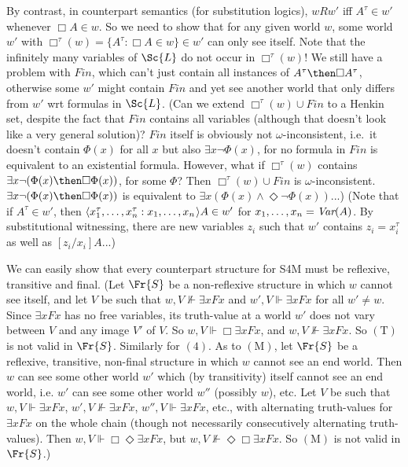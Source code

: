 \documentclass[11pt]{woarticle}
\theoremstyle{break}
\theoremstyle{nonumberplain}
\newcommand{\SAT}{\Vdash}
\newcommand{\1}{\;\,|\;\,}
\newcommand{\var}{\emph{Var}}
\renewcommand{\t}[1]{\ensuremath{\langle #1  \makebox[.2ex]{}\rangle}}
\newcommand{\T}[1]{\ensuremath{(\mathrm{ #1})}}
\begin{document}
{By contrast, in counterpart semantics (for substitution logics),
$wRw'$ iff $A^\tau \in w'$ whenever $\Box A \in w$. So we need to show
that for any given world $w$, some world $w'$ with $\Box^\tau(w) = \{
A^\tau : \Box A \in w \} \in w'$ can only see itself. Note that the
infinitely many variables of $\Sc{L}$ do not occur in $\Box^\tau(w)$!
We still have a problem with $Fin$, which can't just contain all
instances of $A^\tau \then \Box A^\tau$, otherwise some $w'$ might
contain $Fin$ and yet see another world that only differs from $w'$
wrt formulas in $\Sc{L}$. (Can we extend $\Box^\tau(w) \cup Fin$ to a
Henkin set, despite the fact that $Fin$ contains all variables
(although that doesn't look like a very general solution)? $Fin$
itself is obviously not $\omega$-inconsistent, i.e.\ it doesn't
contain $\Phi(x)$ for all $x$ but also $\exists x \neg\Phi(x)$, for no
formula in $Fin$ is equivalent to an existential formula. However,
what if $\Box^\tau(w)$ contains $\exists x \neg(\Phi(x) \then \Box
\Phi(x))$, for some $\Phi$? Then $\Box^\tau(w) \cup Fin$ is
$\omega$-inconsistent. $\exists x \neg (\Phi(x) \then \Box \Phi(x))$
is equivalent to $\exists x (\Phi(x) \land \Diamond \neg \Phi(x))$...)
(Note that if $A^\tau \in w'$, then $\t{x_1^\tau,\ldots,x_n^\tau :
  x_1, \ldots, x_n}A \in w'$ for $x_1,\ldots,x_n = \var(A)$. By
substitutional witnessing, there are new variables $z_i$ such that
$w'$ contains $z_i\!=\!x_i^\tau$ as well as $[z_i/x_i]A$...)

We can easily show that every counterpart structure for S4M must be
reflexive, transitive and final. (Let $\Fr{S}$ be a non-reflexive
structure in which $w$ cannot see itself, and let $V$ be such that
$w,V \not\SAT \exists x Fx$ and $w',V \SAT \exists x Fx$ for all
$w'\not=w$. Since $\exists x Fx$ has no free variables, its
truth-value at a world $w'$ does not vary between $V$ and any image
$V'$ of $V$. So $w,V \SAT \Box \exists x Fx$, and $w,V \not\SAT
\exists x Fx$. So \T{T} is not valid in $\Fr{S}$. Similarly for
\T{4}. As to \T{M}, let $\Fr{S}$ be a reflexive, transitive, non-final
structure in which $w$ cannot see an end world. Then $w$ can see some
other world $w'$ which (by transitivity) itself cannot see an end
world, i.e. $w'$ can see some other world $w''$ (possibly $w$),
etc. Let $V$ be such that $w,V \SAT \exists x Fx$, $w',V \not\SAT
\exists x Fx$, $w'',V \SAT \exists x Fx$, etc., with alternating
truth-values for $\exists x Fx$ on the whole chain (though not
necessarily consecutively alternating truth-values). Then $w,V \SAT
\Box\Diamond\exists x Fx$, but $w,V \not\SAT \Diamond\Box\exists x
Fx$. So \T{M} is not valid in $\Fr{S}$.)

}
\end{document}
